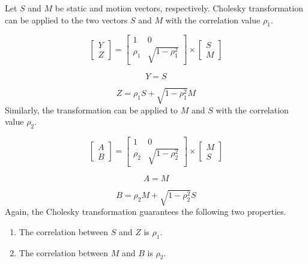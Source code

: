 Let $S$ and $M$ be static and motion vectors, respectively. Cholesky transformation can be applied to the two vectors $S$ and $M$ with the correlation value $\rho_{1}$.

\begin{equation}
\begin{bmatrix}
    Y     \\
    Z
\end{bmatrix}
=
\begin{bmatrix}
    1  & 0 \\
    \rho_{1}  & \sqrt{1-\rho_{1}^2}
\end{bmatrix}
\times
\begin{bmatrix}
    S    \\
    M
\end{bmatrix}
\end{equation}

\begin{equation}
Y = S
\end{equation}

\begin{equation}
Z = \rho_{1} S + \sqrt{1-\rho_{1}^2}M
\end{equation}
Similarly, the transformation can be applied to $M$ and $S$ with the correlation value $\rho_{2}$.


\begin{equation}
\begin{bmatrix}
    A     \\
    B
\end{bmatrix}
=
\begin{bmatrix}
    1  & 0 \\
    \rho_{2}  & \sqrt{1-\rho_{2}^2}
\end{bmatrix}
\times
\begin{bmatrix}
    M    \\
    S
\end{bmatrix}
\end{equation}

\begin{equation}
A = M
\end{equation}

\begin{equation}
B = \rho_{2} M + \sqrt{1-\rho_{2}^2}S
\end{equation}
Again, the Cholesky transformation guarantees the following two properties.


\begin{enumerate}
  \item The correlation between $S$ and $Z$ is $\rho_{1}$.
  \item The correlation between $M$ and $B$ is $\rho_{2}$.
\end{enumerate}

